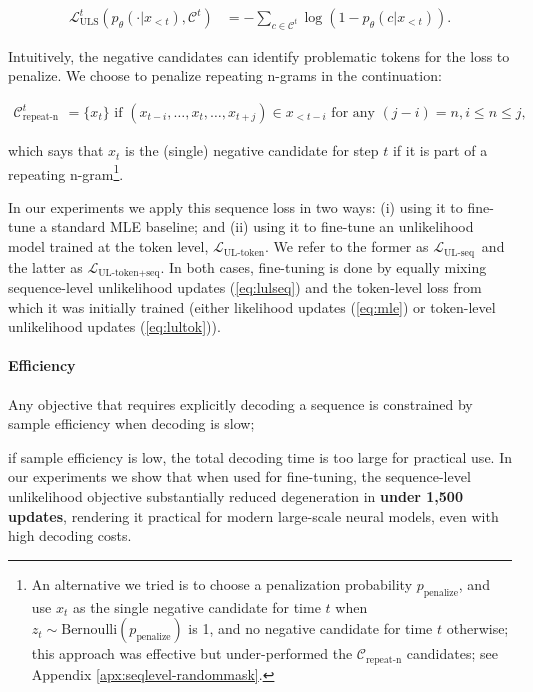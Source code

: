 \begin{align} \label{eq:lulseq}
    \mathcal{L}^t_{\text{ULS}}(p_{\theta}(\cdot|x_{<t}), \mathcal{C}^t)&=-\sum_{c\in \mathcal{C}^t}\log(1-p_{\theta}(c|x_{<t})).
\end{align}

Intuitively, the negative candidates can identify problematic tokens for the loss to penalize. We choose to penalize repeating n-grams in the continuation:

\begin{align}
    \mathcal{C}^t_{\text{repeat-n}} &= \{x_t\} \text{ if }(x_{t-i},\ldots,x_t,\ldots,x_{t+j})\in x_{<{t-i}}\text{ for any } (j-i)=n,i\leq n\leq j,
\end{align}

which says that $x_t$ is the (single) negative candidate for step $t$ if it is part of a repeating n-gram\footnote{An alternative we tried is to choose a penalization probability $p_{\text{penalize}}$, and use $x_t$ as the single negative candidate for time $t$ when $z_t\sim \text{Bernoulli}(p_{\text{penalize}})$ is 1, and no negative candidate for time $t$ otherwise; this approach was effective but under-performed the $\mathcal{C}_{\text{repeat-n}}$ candidates; see Appendix \ref{apx:seqlevel-randommask}.}.

In our experiments we apply this sequence loss in two ways: (i) using it to fine-tune a standard MLE baseline; and (ii) using it to fine-tune an unlikelihood model trained at the token level, $\mathcal{L}_{\text{UL-token}}$. We refer to the former as $\mathcal{L}_{\text{UL-seq}}$~and the latter as $\mathcal{L}_{\text{UL-token+seq}}$.
In both cases, fine-tuning is done by equally mixing sequence-level unlikelihood updates (\ref{eq:lulseq}) and the token-level loss from which it was initially trained (either likelihood updates  (\ref{eq:mle}) or token-level unlikelihood updates (\ref{eq:lultok})).

\paragraph{Efficiency} 

Any objective that requires explicitly decoding a sequence is constrained by sample efficiency when decoding is slow; 

if sample efficiency is low, the total decoding time is too large for practical use. In our experiments we show that when used for fine-tuning, the sequence-level unlikelihood objective substantially reduced degeneration in \textbf{under 1,500 updates}, rendering it practical for modern large-scale neural models, even with high decoding costs.


